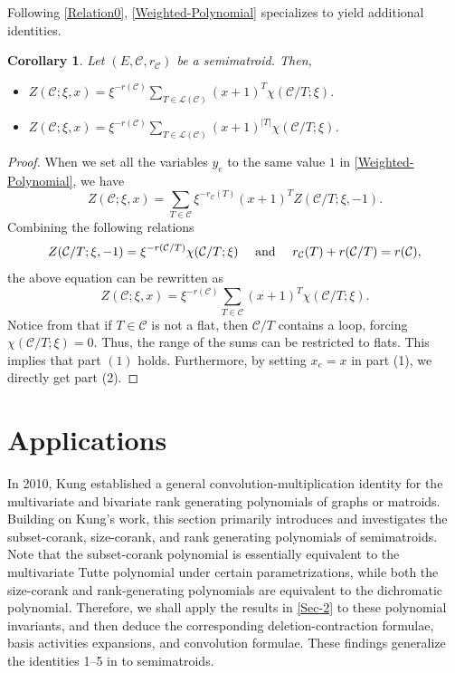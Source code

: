 \documentclass[12pt]{article}%
\renewcommand*{\bm}[1]{#1}%
\numberwithin{equation}{section}
\def\And{\mbox{\rm ~and~}}
\newtheorem{corollary}[corollary]{Corollary}
\begin{document}
Following \eqref{Relation0}, \autoref{Weighted-Polynomial} specializes to yield additional identities.
\begin{corollary}\label{Weighted-Polynomial1}
Let $(E,\mathcal{C},r_{\mathcal{C}})$ be a semimatroid. Then,
\begin{itemize}
\item[{\rm(1)}] $Z(\mathcal{C};\xi,\bm x)=\xi^{-r(\mathcal{C})}\sum_{T\in\mathscr{L}(\mathcal{C})}(\bm x+1)^T\chi(\mathcal{C}/T;\xi)$.
\item[{\rm(2)}] $Z(\mathcal{C};\xi,x)=\xi^{-r(\mathcal{C})}\sum_{T\in\mathscr{L}(\mathcal{C})}(x+1)^{|T|}\chi(\mathcal{C}/T;\xi)$.
\end{itemize}
\end{corollary}
\begin{proof}
When we set all the variables $y_e$ to the same value $1$  in \autoref{Weighted-Polynomial}, we have
\[
Z(\mathcal{C};\xi,\bm x)=\sum_{T\in\mathcal{C}}\xi^{-r_\mathcal{C}(T)}(\bm x+1)^TZ(\mathcal{C}/T;\xi,-1).
\]
Combining the following relations
\[ 
Z(\mathcal{C}/T;\xi,-1)=\xi^{-r(\mathcal{C}/T)}\chi(\mathcal{C}/T;\xi)\quad\And\quad r_\mathcal{C}(T)+r(\mathcal{C}/T)=r(\mathcal{C}),
\]
the above equation can be rewritten as
\[
Z(\mathcal{C};\xi,\bm x)=\xi^{-r(\mathcal{C})}\sum_{T\in\mathcal{C}}(\bm x+1)^T\chi(\mathcal{C}/T;\xi).
\]
Notice from \cite[Lemma 3.6]{Fu2025} that if $T\in\mathcal{C}$ is not a flat, then $\mathcal{C}/T$ contains a loop, forcing $\chi(\mathcal{C}/T;\xi)=0$. Thus, the range of the sums can be restricted to flats. This implies that part $(1)$ holds. Furthermore, by setting $x_e=x$ in part (1), we directly get part (2).
\end{proof}
\section{Applications}\label{Sec-3}
In 2010, Kung \cite{Kung2010} established a general convolution-multiplication identity for the multivariate and bivariate rank generating polynomials of graphs or matroids. Building on Kung's work, this section primarily introduces and investigates the subset-corank, size-corank, and rank generating polynomials of semimatroids. Note that the subset-corank polynomial is essentially equivalent to the multivariate Tutte polynomial under certain parametrizations, while both the size-corank and rank-generating polynomials are equivalent to the dichromatic polynomial. Therefore, we shall apply the results in \autoref{Sec-2} to these polynomial invariants, and then deduce the corresponding deletion-contraction formulae, basis activities expansions, and convolution formulae.  These findings generalize  the identities 1--5 in \cite{Kung2010} to semimatroids.
\end{document}
